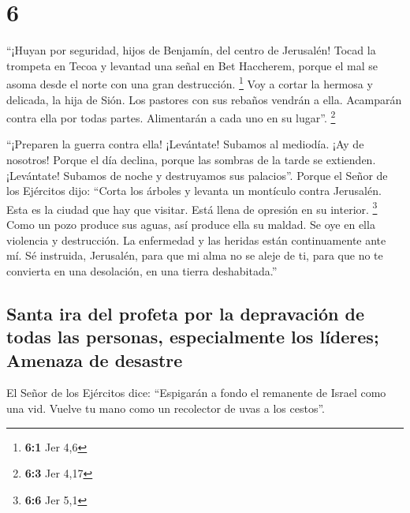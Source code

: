 \hypertarget{section-5}{%
\section{6}\label{section-5}}

 ``¡Huyan por seguridad, hijos de Benjamín, del centro de
Jerusalén! Tocad la trompeta en Tecoa y levantad una señal en Bet
Haccherem, porque el mal se asoma desde el norte con una gran
destrucción. \footnote{\textbf{6:1} Jer 4,6}  Voy a cortar
la hermosa y delicada, la hija de Sión.  Los pastores con
sus rebaños vendrán a ella. Acamparán contra ella por todas partes.
Alimentarán a cada uno en su lugar''. \footnote{\textbf{6:3} Jer 4,17}

 ``¡Preparen la guerra contra ella! ¡Levántate! Subamos al
mediodía. ¡Ay de nosotros! Porque el día declina, porque las sombras de
la tarde se extienden.  ¡Levántate! Subamos de noche y
destruyamos sus palacios''.  Porque el Señor de los
Ejércitos dijo: ``Corta los árboles y levanta un montículo contra
Jerusalén. Esta es la ciudad que hay que visitar. Está llena de opresión
en su interior. \footnote{\textbf{6:6} Jer 5,1}  Como un
pozo produce sus aguas, así produce ella su maldad. Se oye en ella
violencia y destrucción. La enfermedad y las heridas están continuamente
ante mí.  Sé instruida, Jerusalén, para que mi alma no se
aleje de ti, para que no te convierta en una desolación, en una tierra
deshabitada.''

\hypertarget{santa-ira-del-profeta-por-la-depravaciuxf3n-de-todas-las-personas-especialmente-los-luxedderes-amenaza-de-desastre}{%
\subsection{Santa ira del profeta por la depravación de todas las
personas, especialmente los líderes; Amenaza de
desastre}\label{santa-ira-del-profeta-por-la-depravaciuxf3n-de-todas-las-personas-especialmente-los-luxedderes-amenaza-de-desastre}}

 El Señor de los Ejércitos dice: ``Espigarán a fondo el
remanente de Israel como una vid. Vuelve tu mano como un recolector de
uvas a los cestos''.


